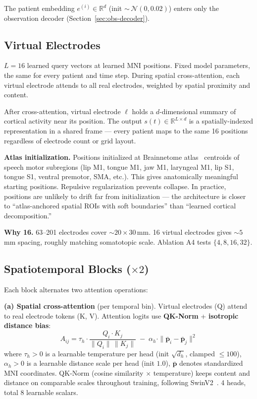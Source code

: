 \documentclass[11pt,letterpaper]{article}
\newcommand{\bfp}{\mathbf{p}}
\newcommand{\R}{\mathbb{R}}
\begin{document}
The patient embedding $e^{(i)} \in \R^d$ (init ${\sim}\,\mathcal{N}(0, 0.02)$) enters only the observation decoder (Section~\ref{sec:obs-decoder}).


\subsection{Virtual Electrodes}\label{sec:virtual-electrodes}

$L = 16$ learned query vectors at learned MNI positions. Fixed model parameters, the same for every patient and time step. During spatial cross-attention, each virtual electrode attends to all real electrodes, weighted by spatial proximity and content.

After cross-attention, virtual electrode $\ell$ holds a $d$-dimensional summary of cortical activity near its position. The output $s(t) \in \R^{L \times d}$ is a spatially-indexed representation in a shared frame --- every patient maps to the same 16 positions regardless of electrode count or grid layout.

\textbf{Atlas initialization.} Positions initialized at Brainnetome atlas~\cite{fan2016} centroids of speech motor subregions (lip M1, tongue M1, jaw M1, laryngeal M1, lip S1, tongue S1, ventral premotor, SMA, etc.). This gives anatomically meaningful starting positions. Repulsive regularization prevents collapse. In practice, positions are unlikely to drift far from initialization --- the architecture is closer to ``atlas-anchored spatial ROIs with soft boundaries'' than ``learned cortical decomposition.''

\textbf{Why 16.} 63--201 electrodes cover ${\sim}20 \times 30$\,mm. 16 virtual electrodes gives ${\sim}5$\,mm spacing, roughly matching somatotopic scale. Ablation A4 tests $\{4, 8, 16, 32\}$.


\subsection{Spatiotemporal Blocks ($\times 2$)}\label{sec:blocks}

Each block alternates two attention operations:

\textbf{(a) Spatial cross-attention} (per temporal bin). Virtual electrodes (Q) attend to real electrode tokens (K, V). Attention logits use \textbf{QK-Norm} + \textbf{isotropic distance bias}:
\begin{equation}
A_{ij} = \tau_h \cdot \frac{Q_i \cdot K_j}{\|Q_i\|\,\|K_j\|} \;-\; \alpha_h \cdot \|\bar{\bfp}_i - \bar{\bfp}_j\|^2
\end{equation}
where $\tau_h > 0$ is a learnable temperature per head (init $\sqrt{d_h}$, clamped $\leq 100$), $\alpha_h > 0$ is a learnable distance scale per head (init $1.0$), $\bar{\bfp}$ denotes standardized MNI coordinates. QK-Norm (cosine similarity $\times$ temperature) keeps content and distance on comparable scales throughout training, following SwinV2~\cite{liu2022swinv2}. 4 heads, total 8 learnable scalars.
\end{document}

